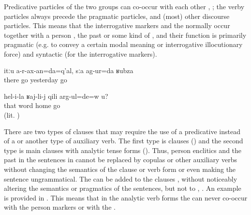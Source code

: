 Predicative particles of the two groups can co-occur with each other , ; the verby particles always precede the pragmatic particles, and (most) other discourse particles. This means that the interrogative markers and the  normally occur together with a person , the past  or some kind of , and their function is primarily pragmatic (e.g. to convey a certain modal meaning or interrogative illocutionary force) and syntactic (for the interrogative markers).

\begin{exe}
	\ex	\label{ex:‎‎‎Am I will not go there, I went yesterday minor}
	\gll	itːu	a-r-ax-an=da=q'al,	sːa	ag-ur=da	ʁubza\\
		there	go	yesterday	go	\\
	\glt	{}

	\ex	\label{ex:Are you going home because of what she said minor}
	\gll	hel-i-la	ʁaj-li-j	qili	arg-ul=de=w	u?\\
		that	word	home	go	\\
	\glt	{} (lit. )
\end{exe}

There are two types of clauses that may require the use of a predicative  instead of a  or another type of auxiliary verb. The first type is  clauses () and the second type is main clauses with analytic tense forms (). Thus, person enclitics and the past  in the sentences in  cannot be replaced by copulas or other auxiliary verbs without changing the semantics of the clause or verb form or even making the sentence ungrammatical. The  can be added to the clauses ,  without noticeably altering the semantics or pragmatics of the sentences, but not to , . An example is provided in . This means that in the analytic verb forms the  can never co-occur with the person markers or with the  .

